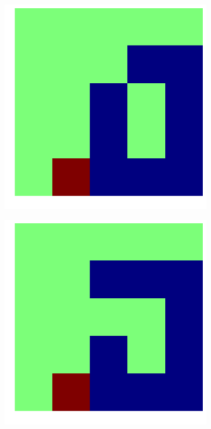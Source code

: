 \documentclass{article}
\begin{document}
\begin{figure}[!htpb]
\begin{subfigure}[b]{.19\linewidth}
  \end{subfigure}
  \begin{subfigure}[b]{.19\linewidth}
    \includegraphics[width=\linewidth]{snake_68.png}
  \end{subfigure}
  \begin{subfigure}[b]{.19\linewidth}
    \includegraphics[width=\linewidth]{snake_69.png}

\end{subfigure}
\end{figure}
\end{document}
